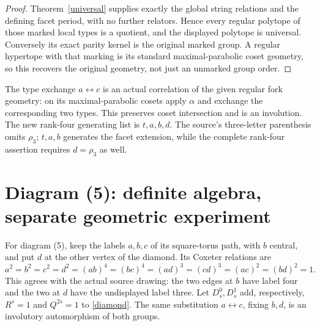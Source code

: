 \documentclass[11pt,a4paper]{article}
\begin{document}
\begin{proof}
Theorem~\ref{universal} supplies exactly the global string relations and
the defining facet period, with no further relators. Hence every regular
polytope of those marked local types is a quotient, and the displayed
polytope is universal. Conversely its exact parity kernel is the original
marked group. A regular hypertope with that marking is its standard
maximal-parabolic coset geometry, so this recovers the original geometry,
not just an unmarked group order.
\end{proof}

The type exchange $a\leftrightarrow c$ is an actual correlation of the
given regular fork geometry: on its maximal-parabolic cosets apply
$\alpha$ and exchange the corresponding two types. This preserves
coset intersection and is an involution. The new rank-four generating
list is $t,a,b,d$. The source's three-letter parenthesis omits $\rho _3$;
$t,a,b$ generates the facet extension, while the complete rank-four
assertion requires $d=\rho _3$ as well.

\section{Diagram (5): definite algebra, separate geometric experiment}
For diagram (5), keep the labels $a,b,c$ of its square-torus path, with
$b$ central, and put $d$ at the other vertex of the diamond. Its Coxeter
relations are
\begin{equation}\label{diamond}
 a^2=b^2=c^2=d^2=(ab)^4=(bc)^4=(ad)^3=(cd)^3
 =(ac)^2=(bd)^2=1.
\end{equation}
This agrees with the actual source drawing: the two edges at $b$ have
label four and the two at $d$ have the undisplayed label three.
Let $D_s^0,D_s^1$ add, respectively, $R^s=1$ and $Q^{2s}=1$ to
\eqref{diamond}. The same substitution $a\leftrightarrow c$, fixing
$b,d$, is an involutory automorphism of both groups.
\end{document}
